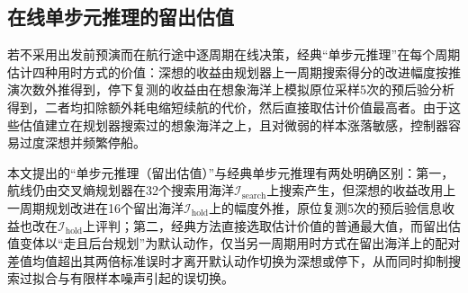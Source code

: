 \subsection{在线单步元推理的留出估值}

若不采用出发前预演而在航行途中逐周期在线决策，经典“单步元推理”\cite{russell1991right}在每个周期估计四种用时方式的价值：深想的收益由规划器上一周期搜索得分的改进幅度按推演次数外推得到，停下复测的收益由在想象海洋上模拟原位采样5次的预后验分析得到，二者均扣除额外耗电缩短续航的代价，然后直接取估计价值最高者。由于这些估值建立在规划器搜索过的想象海洋之上，且对微弱的样本涨落敏感，控制器容易过度深想并频繁停船。

本文提出的“单步元推理（留出估值）”与经典单步元推理有两处明确区别：第一，航线仍由交叉熵规划器在32个搜索用海洋$\mathcal{I}_{\text{search}}$上搜索产生，但深想的收益改用上一周期规划改进在16个留出海洋$\mathcal{I}_{\text{hold}}$上的幅度外推，原位复测5次的预后验信息收益也改在$\mathcal{I}_{\text{hold}}$上评判；第二，经典方法直接选取估计价值的普通最大值，而留出估值变体以“走且后台规划”为默认动作，仅当另一周期用时方式在留出海洋上的配对差值均值超出其两倍标准误时才离开默认动作切换为深想或停下，从而同时抑制搜索过拟合与有限样本噪声引起的误切换。
